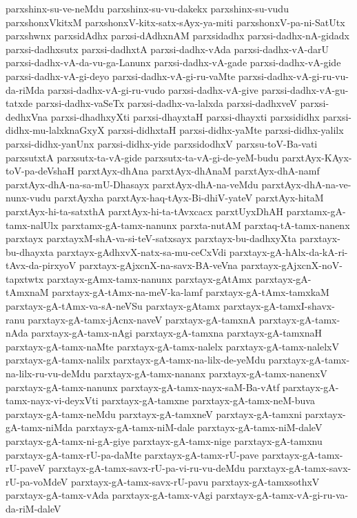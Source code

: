 {parxshinx-su-ve-neMdu
parxshinx-su-vu-dakekx
parxshinx-su-vudu
parxshonxVkitxM
parxshonxV-kitx-satx-sAyx-ya-miti
parxshonxV-pa-ni-SatUtx
parxshwnx
parxsidAdhx
parxsi-dAdhxnAM
parxsidadhx
parxsi-dadhx-nA-gidadx
parxsi-dadhxsutx
parxsi-dadhxtA
parxsi-dadhx-vAda
parxsi-dadhx-vA-darU
parxsi-dadhx-vA-da-vu-ga-Lanunx
parxsi-dadhx-vA-gade
parxsi-dadhx-vA-gide
parxsi-dadhx-vA-gi-deyo
parxsi-dadhx-vA-gi-ru-vaMte
parxsi-dadhx-vA-gi-ru-vu-da-riMda
parxsi-dadhx-vA-gi-ru-vudo
parxsi-dadhx-vA-give
parxsi-dadhx-vA-gu-tatxde
parxsi-dadhx-vaSeTx
parxsi-dadhx-va-lalxda
parxsi-dadhxveV
parxsi-dedhxVna
parxsi-dhadhxyXti
parxsi-dhayxtaH
parxsi-dhayxti
parxsididhx
parxsi-didhx-mu-lalxknaGxyX
parxsi-didhxtaH
parxsi-didhx-yaMte
parxsi-didhx-yalilx
parxsi-didhx-yanUnx
parxsi-didhx-yide
parxsidodhxV
parxsu-toV-Ba-vati
parxsutxtA
parxsutx-ta-vA-gide
parxsutx-ta-vA-gi-de-yeM-budu
parxtAyx-KAyx-toV-pa-deVshaH
parxtAyx-dhAna
parxtAyx-dhAnaM
parxtAyx-dhA-namf
parxtAyx-dhA-na-sa-mU-Dhasayx
parxtAyx-dhA-na-veMdu
parxtAyx-dhA-na-ve-nunx-vudu
parxtAyxha
parxtAyx-haq-tAyx-Bi-dhiV-yateV
parxtAyx-hitaM
parxtAyx-hi-ta-satxthA
parxtAyx-hi-ta-tAvxcacx
parxtUyxDhAH
parxtamx-gA-tamx-nalUlx
parxtamx-gA-tamx-nanunx
parxta-nutAM
parxtaq-tA-tamx-nanenx
parxtayx
parxtayxM-shA-va-si-teV-satxsayx
parxtayx-bu-dadhxyXta
parxtayx-bu-dhayxta
parxtayx-gAdhxvX-natx-sa-mu-ceCxVdi
parxtayx-gA-hAlx-da-kA-ri-tAvx-da-pirxyoV
parxtayx-gAjxcnX-na-savx-BA-veVna
parxtayx-gAjxcnX-noV-tapxtwtx
parxtayx-gAmx-tamx-nanunx
parxtayx-gAtAmx
parxtayx-gA-tAmxnaM
parxtayx-gA-tAmx-na-meV-ka-lamf
parxtayx-gA-tAmx-tamxkaM
parxtayx-gA-tAmx-va-sA-neVSu
parxtayx-gAtamx
parxtayx-gA-tamxI-shavx-ranu
parxtayx-gA-tamx-jAcnx-naveV
parxtayx-gA-tamxnA
parxtayx-gA-tamx-nAda
parxtayx-gA-tamx-nAgi
parxtayx-gA-tamxna
parxtayx-gA-tamxnaH
parxtayx-gA-tamx-naMte
parxtayx-gA-tamx-nalelx
parxtayx-gA-tamx-nalelxV
parxtayx-gA-tamx-nalilx
parxtayx-gA-tamx-na-lilx-de-yeMdu
parxtayx-gA-tamx-na-lilx-ru-vu-deMdu
parxtayx-gA-tamx-nananx
parxtayx-gA-tamx-nanenxV
parxtayx-gA-tamx-nanunx
parxtayx-gA-tamx-nayx-saM-Ba-vAtf
parxtayx-gA-tamx-nayx-vi-deyxVti
parxtayx-gA-tamxne
parxtayx-gA-tamx-neM-buva
parxtayx-gA-tamx-neMdu
parxtayx-gA-tamxneV
parxtayx-gA-tamxni
parxtayx-gA-tamx-niMda
parxtayx-gA-tamx-niM-dale
parxtayx-gA-tamx-niM-daleV
parxtayx-gA-tamx-ni-gA-giye
parxtayx-gA-tamx-nige
parxtayx-gA-tamxnu
parxtayx-gA-tamx-rU-pa-daMte
parxtayx-gA-tamx-rU-pave
parxtayx-gA-tamx-rU-paveV
parxtayx-gA-tamx-savx-rU-pa-vi-ru-vu-deMdu
parxtayx-gA-tamx-savx-rU-pa-voMdeV
parxtayx-gA-tamx-savx-rU-pavu
parxtayx-gA-tamxsothxV
parxtayx-gA-tamx-vAda
parxtayx-gA-tamx-vAgi
parxtayx-gA-tamx-vA-gi-ru-va-da-riM-daleV
}
